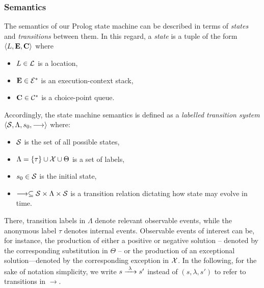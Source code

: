 \documentclass[12pt,a4paper,openright,twoside]{book}
\begin{document}
\subsubsection{Semantics}

The semantics of our Prolog state machine can be described in terms of \emph{states} and \emph{transitions} between them.
%
In this regard, a \emph{state} is a tuple of the form $\langle L, \mathbf{E}, \mathbf{C} \rangle$ where
%
\begin{itemize}
    \item $L \in \mathcal{L}$ is a location,
    \item $\mathbf{E} \in \mathcal{E}^*$ is an execution-context stack,
    \item $\mathbf{C} \in \mathcal{C}^*$ is a choice-point queue.
\end{itemize}

Accordingly, the state machine semantics is defined as a \emph{labelled transition system} $\langle \mathcal{S}, \Lambda, s_0, \longrightarrow \rangle$ where:
%
\begin{itemize}
    \item $\mathcal{S}$ is the set of all possible states,
    \item $\Lambda = \{ \tau \} \cup \mathcal{X} \cup \Theta $ is a set of labels,
    \item $s_0 \in \mathcal{S}$ is the initial state,
    \item $\longrightarrow \subseteq \mathcal{S} \times \Lambda \times \mathcal{S}$ is a transition relation dictating how state may evolve in time.
\end{itemize}
%
There, transition labels in $\Lambda$ denote relevant observable events, while the anonymous label $\tau$ denotes internal events.
%
Observable events of interest can be, for instance, the production of either a positive or negative solution -- denoted by the corresponding substitution in $\Theta$ -- or the production of an exceptional solution---denoted by the corresponding exception in $\mathcal{X}$.
%
In the following, for the sake of notation simplicity, we write $s \xrightarrow{\ \lambda\ } s'$ instead of $(s, \lambda, s')$ to refer to transitions in $\longrightarrow$.
\end{document}
